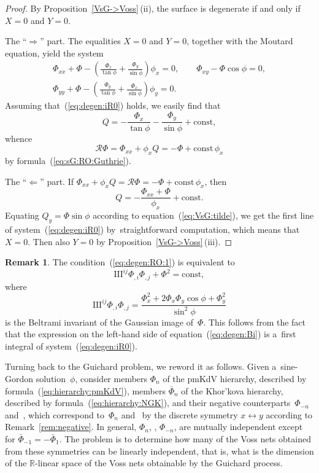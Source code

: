 \documentclass[pdftex]{sigma}
\def\eqref#1{{\rm(\ref{#1})}}
\def\RR{{\mathbb R}}
\def\RO{{\mathcal R}}
\numberwithin{equation}{section}
\theoremstyle{definition}
\newtheorem{Remark}[Theorem]{Remark}
\begin{document}
\begin{proof}
By Proposition~\ref{VsG->Voss}\,(ii),
the surface %
is degenerate if and only if $X = 0$ and $Y = 0$.

The ``$\Rightarrow$'' part.
The equalities $X = 0$ and $Y = 0$, together with
the Moutard equation, yield the system
\begin{gather}
\Phi_{xx} + \Phi
 - \left(\frac{\Phi_x}{\tan\phi} + \frac{\Phi_y}{\sin\phi}\right) \phi_x = 0,
\qquad
\Phi_{xy} - \Phi \cos\phi = 0,
\nonumber
\\
\Phi_{yy} + \Phi
 - \left(\frac{\Phi_y}{\tan\phi} + \frac{\Phi_x}{\sin \phi}\right) \phi_y = 0.
\label{eq:degen:iR0}
\end{gather}
Assuming that~\eqref{eq:degen:iR0} holds, we easily find that
\[
Q = -\frac{\Phi_x}{\tan\phi}-\frac{\Phi_y}{\sin\phi} + \text{const},
\]
whence
\[
\RO\Phi = \Phi_{xx} + \phi_x Q = -\Phi + \text{const}\, \phi_x
\]
by formula~\eqref{eq:sG:RO:Guthrie}.

The ``$\Leftarrow$'' part.
If
$\Phi_{xx} + \phi_x Q = \RO\Phi = -\Phi + \text{const}\, \phi_x$, then
\[
Q = -\frac{\Phi_{xx} + \Phi}{\phi_x} + \text{const}.
\]
Equating $Q_y \!=\! \Phi \sin \phi$ according to
equation~\eqref{eq:VsG:tilde},
we get the first line of system~\eqref{eq:degen:iR0} by~straightforward
computation,
which means that $X = 0$.
Then also $Y = 0$ by
Proposition~\ref{VsG->Voss}\,(iii).
\end{proof}


\begin{Remark}
The condition~\eqref{eq:degen:RO:1} is equivalent to
\begin{equation}
\label{eq:degen:Bi}
\mathrm{III}^{ij} \Phi_{,i }\Phi_{,j} + \Phi^2 = \mathrm{const,}
\end{equation}
where
\[
\mathrm{III}^{ij} \Phi_{,i }\Phi_{,j}
 = \frac{\Phi_x^2 + 2 \Phi_x \Phi_y \cos\phi + \Phi_y^2}{\sin^2 \phi}
\]
is the Beltrami invariant of the Gaussian image of~$\Phi$.
This follows from the fact that the expression on the left-hand side
of equation~\eqref{eq:degen:Bi} is a~first integral of
system~\eqref{eq:degen:iR0}.
\end{Remark}


Turning back to the Guichard problem, we reword it as follows.
Given a~sine-Gordon solution~$\phi$, consider
members $\Phi_n$ of the pmKdV hierarchy, described by
formula~\eqref{eq:hierarchy:pmKdV},
members $\bar\Phi_n$ of the Khor'kova hierarchy, described by
formula~\eqref{eq:hierarchy:NGK},
and their negative counterparts~$\Phi_{-n}$ and~,
which correspond to~$\Phi_n$ and~ by the discrete
symmetry $x \leftrightarrow y$ according to Remark~\ref{rem:negative}.
In general,
$\Phi_n$, , $\Phi_{-n}$, 
are mutually independent except for
$\bar\Phi_{-1} = -\bar\Phi_1$.
The problem is to determine how many of the Voss nets obtained from
these symmetries can be linearly independent, that is, what is
the dimension of the $\RR$-linear space of the Voss nets obtainable by
the Guichard process.
\end{document}
